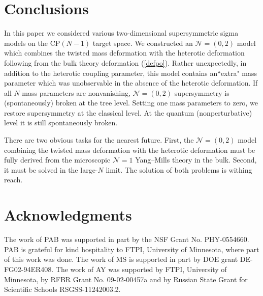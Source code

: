 \documentclass[12pt]{article}
\newcommand{\ntwoo}{${\mathcal N}= \left(0,2\right) $ }
\newcommand{\none}{${\mathcal N}=1$ }
\begin{document}
	
\section{Conclusions}
\label{con}

In this paper we considered various two-dimensional supersymmetric sigma models on the CP$(N-1)$
target space. We constructed an \ntwoo  model which combines the twisted mass deformation 
with the heterotic deformation following from
the bulk theory deformation (\ref{defpo}). Rather unexpectedly, in addition to the heterotic coupling parameter,
this model  contains an``extra" mass parameter which was unobservable in the absence of the heterotic deformation.
If all $N$ mass parameters are nonvanishing, \ntwoo supersymmetry is (spontaneously) broken at
the tree level. Setting one  mass parameters to zero, we restore supersymmetry at the classical 
level. At the quantum (nonperturbative) level it is still spontaneously broken.

There are two obvious tasks for the nearest future. First, the \ntwoo  model   combining the twisted mass deformation 
with the heterotic deformation must be fully derived from the microscopic \none Yang--Mills theory in the bulk.
Second, it must be solved in the large-$N$ limit. The solution of both problems is withing reach.
	
	
\section*{Acknowledgments}
The work of PAB was supported in part by the NSF Grant No. PHY-0554660. PAB is grateful for kind
hospitality to FTPI, University of Minnesota, where part of this work was done. 
The work of MS is supported in part by DOE grant DE-FG02-94ER408. 
The work of AY was  supported 
by  FTPI, University of Minnesota, 
by RFBR Grant No. 09-02-00457a 
and by Russian State Grant for 
Scientific Schools RSGSS-11242003.2.
\end{document}
